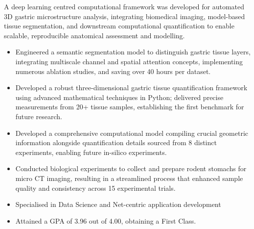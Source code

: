 \documentclass[12pt,a4paper,withhyper]{altacv}
\begin{document}
A deep learning centred computational framework was developed for automated 3D gastric microstructure analysis, integrating biomedical imaging, model-based tissue segmentation, and downstream computational quantification to enable scalable, reproducible anatomical assessment and modelling.
\begin{itemize}
    \item Engineered a semantic segmentation model to distinguish gastric tissue layers, integrating multiscale channel and spatial attention concepts, implementing numerous ablation studies, and saving over 40 hours per dataset.
    \item Developed a robust three-dimensional gastric tissue quantification framework using advanced mathematical techniques in Python; delivered precise measurements from 20+ tissue samples, establishing the first benchmark for future research.
    \item Developed a comprehensive computational model compiling crucial geometric information alongside quantification details sourced from 8 distinct experiments, enabling future in-silico experiments.
    \item Conducted biological experiments to collect and prepare rodent stomachs for micro CT imaging, resulting in a streamlined process that enhanced sample quality and consistency across 15 experimental trials.
\end{itemize}

\divider{}

\begin{itemize}
    \item Specialised in Data Science and Net-centric application development
    \item Attained a GPA of 3.96 out of 4.00, obtaining a First Class.
\end{itemize}

\medskip


\end{document}
